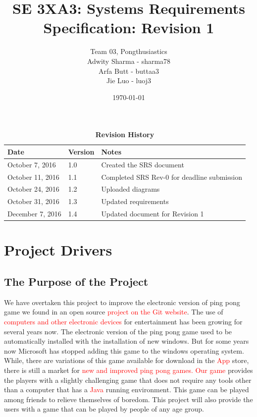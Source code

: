 \documentclass[12pt,letterpaper]{article}
\title{SE 3XA3: Systems Requirements Specification: Revision 1}
\author{Team 03, Pongthusiastics 		
\\ Adwity Sharma - sharma78 		
\\ Arfa Butt - buttaa3 	
\\ Jie Luo - luoj3 }
\date{\today}
\begin{document}
\maketitle
\newpage
\tableofcontents

\listoftables
\listoffigures
\begin{table}[h]
\caption{\bf Revision History}
\begin{tabularx}{\textwidth}{p{3.5cm}p{2cm}X}
\toprule {\bf Date} & {\bf Version} & {\bf Notes}\\
\midrule
October 7, 2016 & 1.0 & Created the SRS document \\
October 11, 2016 & 1.1 & Completed SRS Rev-0 for deadline submission\\
October 24, 2016 & 1.2 & Uploaded diagrams \\
October 31, 2016 & 1.3 & Updated requirements \\
December 7, 2016 & 1.4 & Updated document for Revision 1\\

\bottomrule
\end{tabularx}
\end{table}

\newpage


	
	\section{Project Drivers}
	\subsection{The Purpose of the Project}
	We have overtaken this project to improve the electronic version of ping pong game we found in an open source \textcolor{red}{project on the Git website}. The use of \textcolor{red}{computers and other electronic devices} for entertainment has been growing for several years now. The electronic version of the ping pong game used to be automatically installed with the installation of new windows. But for some years now Microsoft has stopped adding this game to the windows operating system. While, there are variations of this game available for download in the \textcolor{red}{App} store, there is still a market for \textcolor{red}{new and improved ping pong games. Our game} provides the players with a slightly challenging game that does not require any tools other than a computer that has a \textcolor{red}{Java} running environment. This game can be played among friends to relieve themselves of boredom. This project will also provide the users with a game that can be played by people of any age group. \\
\end{document}
